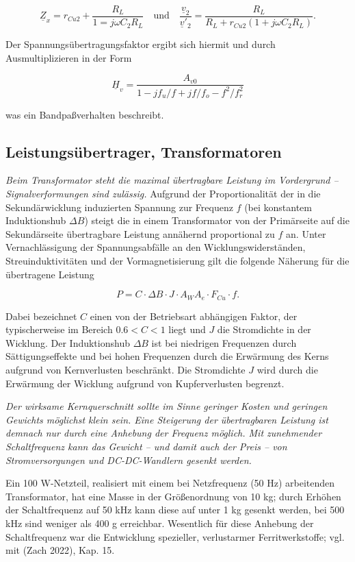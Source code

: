 \documentclass[
  ngerman,
  letterpaper,
]{scrbook}
\begin{document}
\[
\underline{Z}_x = r_{Cu2} + \frac{R_L}{1 = j\omega C_2 R_L} \quad\text{und}\quad 
\frac{\underline{v}_2}{\underline{v}'_2} = \frac{R_L}{R_L + r_{Cu2}(1 + j\omega C_2 R_L)}.
\]

Der Spannungsübertragungsfaktor ergibt sich hiermit und durch
Ausmultiplizieren in der Form

\[
\underline{H}_v = \frac{A_{v0}}{1 − j f_u/f + jf/f_o − f^2/f^2_r}
\]

was ein Bandpaßverhalten beschreibt.

\subsection{Leistungsübertrager,
Transformatoren}\label{leistungsuxfcbertrager-transformatoren}

\emph{Beim Transformator steht die maximal übertragbare Leistung im
Vordergrund -- Signalverformungen sind zulässig.} Aufgrund der
Proportionalität der in die Sekundärwicklung induzierten Spannung zur
Frequenz \(f\) (bei konstantem Induktionshub \(\Delta B\)) steigt die in
einem Transformator von der Primärseite auf die Sekundärseite
übertragbare Leistung annähernd proportional zu \(f\) an. Unter
Vernachlässigung der Spannungsabfälle an den Wicklungswiderständen,
Streuinduktivitäten und der Vormagnetisierung gilt die folgende Näherung
für die übertragene Leistung

\[
P = C \cdot \Delta B \cdot J \cdot A_W A_e \cdot F_{Cu} \cdot f.
\]

Dabei bezeichnet \(C\) einen von der Betriebsart abhängigen Faktor, der
typischerweise im Bereich \(0.6 < C < 1\) liegt und \(J\) die
Stromdichte in der Wicklung. Der Induktionshub \(\Delta B\) ist bei
niedrigen Frequenzen durch Sättigungseffekte und bei hohen Frequenzen
durch die Erwärmung des Kerns aufgrund von Kernverlusten beschränkt. Die
Stromdichte \(J\) wird durch die Erwärmung der Wicklung aufgrund von
Kupferverlusten begrenzt.

\emph{Der wirksame Kernquerschnitt sollte im Sinne geringer Kosten und
geringen Gewichts möglichst klein sein. Eine Steigerung der
übertragbaren Leistung ist demnach nur durch eine Anhebung der Frequenz
möglich. Mit zunehmender Schaltfrequenz kann das Gewicht -- und damit
auch der Preis -- von Stromversorgungen und DC-DC-Wandlern gesenkt
werden.}

Ein 100 W-Netzteil, realisiert mit einem bei Netzfrequenz (50 Hz)
arbeitenden Transformator, hat eine Masse in der Größenordnung von 10
kg; durch Erhöhen der Schaltfrequenz auf 50 kHz kann diese auf unter 1
kg gesenkt werden, bei 500 kHz sind weniger als 400 g erreichbar.
Wesentlich für diese Anhebung der Schaltfrequenz war die Entwicklung
spezieller, verlustarmer Ferritwerkstoffe; vgl. mit (Zach 2022), Kap.
15.
\end{document}
